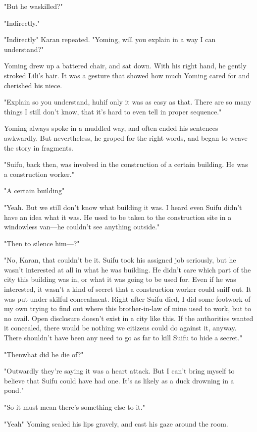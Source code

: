 "But he was\el killed?"

"Indirectly."

"Indirectly\el " Karan repeated. "Yoming, will you explain in a way I can
understand?"

Yoming drew up a battered chair, and sat down. With his right hand, he
gently stroked Lili's hair. It was a gesture that showed how much Yoming
cared for and cherished his niece.

"Explain so you understand, huh\el if only it was as easy as that. There
are so many things I still don't know, that it's hard to even tell in
proper sequence."

Yoming always spoke in a muddled way, and often ended his sentences
awkwardly. But nevertheless, he groped for the right words, and began to
weave the story in fragments.

"Suifu, back then, was involved in the construction of a certain
building. He was a construction worker."

"A certain building\el "

"Yeah. But we still don't know what building it was. I heard even Suifu
didn't have an idea what it was. He used to be taken to the construction
site in a windowless van---he couldn't see anything outside."

"Then to silence him---?"

"No, Karan, that couldn't be it. Suifu took his assigned job seriously,
but he wasn't interested at all in what he was building. He didn't care
which part of the city this building was in, or what it was going to be
used for. Even if he was interested, it wasn't a kind of secret that a
construction worker could sniff out. It was put under skilful
concealment. Right after Suifu died, I did some footwork of my own
trying to find out where this brother-in-law of mine used to work, but
to no avail. Open disclosure doesn't exist in a city like this. If the
authorities wanted it concealed, there would be nothing we citizens
could do against it, anyway. There shouldn't have been any need to go as
far to kill Suifu to hide a secret."

"Then\el what did he die of?"

"Outwardly they're saying it was a heart attack. But I can't bring
myself to believe that Suifu could have had one. It's as likely as a
duck drowning in a pond."

"So it must mean there's something else to it."

"Yeah\el " Yoming sealed his lips gravely, and cast his gaze around the
room.

